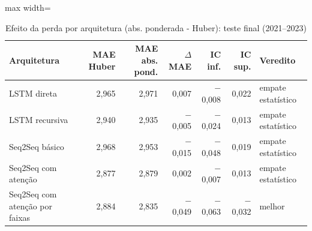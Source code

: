 \begin{table}[!htbp]
    \centering
    \caption{Efeito da perda por arquitetura (abs. ponderada - Huber): teste final (2021--2023)}
    \label{tab:fatorial_perda_holdout}
    \small
    \begin{adjustbox}{max width=\textwidth}
    \begin{tabular}{lrrrrrl}
        \toprule
        Arquitetura & MAE Huber & MAE abs. pond. & $\Delta$ MAE & IC inf. & IC sup. & Veredito \\
        \midrule
        LSTM direta & 2,965 & 2,971 & 0,007 & $-$0,008 & 0,022 & empate estatístico \\
        LSTM recursiva & 2,940 & 2,935 & $-$0,005 & $-$0,024 & 0,013 & empate estatístico \\
        Seq2Seq básico & 2,968 & 2,953 & $-$0,015 & $-$0,048 & 0,019 & empate estatístico \\
        Seq2Seq com atenção & 2,877 & 2,879 & 0,002 & $-$0,007 & 0,013 & empate estatístico \\
        Seq2Seq com atenção por faixas & 2,884 & 2,835 & $-$0,049 & $-$0,063 & $-$0,032 & melhor \\
        \bottomrule
    \end{tabular}
    \end{adjustbox}
\end{table}
